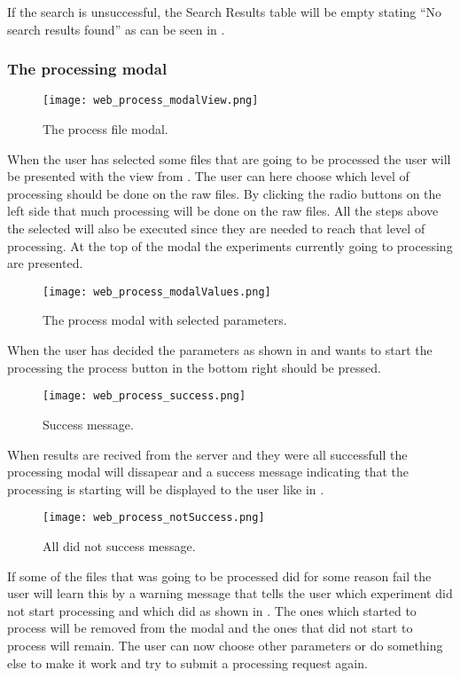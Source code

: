 If the search is unsuccessful, the Search Results table will be empty stating “No search results found” as can be seen in .

\subsubsection{The processing modal}
\begin{figure}[h]
\centering
\texttt{[image: web\_process\_modalView.png]}
\caption{\label{fig:web_process_modalView}The process file modal.}
\end{figure}
When the user has selected some files that are going to be processed the user will be presented with the view from . The user can here choose which level of processing should be done on the raw files. By clicking the radio buttons on the left side that much processing will be done on the raw files. All the steps above the selected will also be executed since they are needed to reach that level of processing.
At the top of the modal the experiments currently going to processing are presented.
\begin{figure}[h]
\centering
\texttt{[image: web\_process\_modalValues.png]}
\caption{\label{fig:web_process_modalValues}The process modal with selected parameters.}
\end{figure}
When the user has decided the parameters as shown in  and wants to start the processing the process button in the bottom right should be pressed. 
\begin{figure}[h]
\centering
\texttt{[image: web\_process\_success.png]}
\caption{\label{fig:web_process_success}Success message.}
\end{figure}
When results are recived from the server and they were all successfull the processing modal will dissapear and a success message indicating that the processing is starting will be displayed to the user like in .
\begin{figure}[h]
\centering
\texttt{[image: web\_process\_notSuccess.png]}
\caption{\label{fig:web_process_notSuccess}All did not success message.}
\end{figure}
If some of the files that was going to be processed did for some reason fail the user will learn this by a warning message that tells the user which experiment did not start processing and which did as shown in . The ones which started to process will be removed from the modal and the ones that did not start to process will remain. The user can now choose other parameters or do something else to make it work and try to submit a processing request again.
